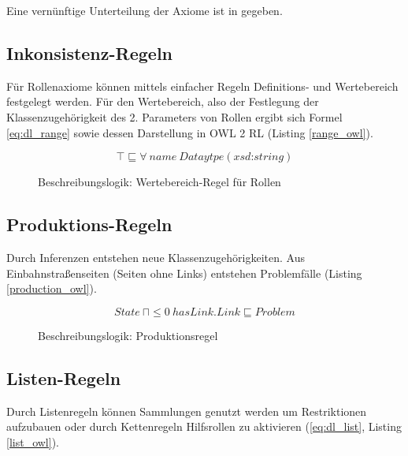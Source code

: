 \documentclass[runningheads,a4paper]{llncs}
\begin{document}
Eine vernünftige Unterteilung der Axiome ist in \cite{owl2rif} gegeben. 


\subsection{Inkonsistenz-Regeln}
\label{sec:rule_inconsistency}

Für Rollenaxiome können mittels einfacher Regeln Definitions- und Wertebereich festgelegt werden. 
Für den Wertebereich, also der Festlegung der Klassenzugehörigkeit des 2. Parameters von Rollen ergibt sich Formel \eqref{eq:dl_range} sowie dessen Darstellung in OWL 2 RL (Listing \ref{range_owl}).

\begin{figure}
\begin{equation}
\top \sqsubseteq \forall\ name\ Dataytpe(\textit{xsd:string})
\label{eq:dl_range}
\end{equation}
\caption{Beschreibungslogik: Wertebereich-Regel für Rollen}
\end{figure}



\subsection{Produktions-Regeln}
\label{sec:rule_production}

Durch Inferenzen entstehen neue Klassenzugehörigkeiten. 
Aus Einbahnstraßenseiten (Seiten ohne Links) entstehen Problemfälle (Listing \ref{production_owl}). 
\begin{figure}
\begin{equation}
State\ \sqcap \leq 0\ hasLink.Link \sqsubseteq Problem
\label{eq:dl_infered}
\end{equation}
\caption{Beschreibungslogik: Produktionsregel}
\end{figure}



\subsection{Listen-Regeln}
\label{sec:rule_list}

Durch Listenregeln können Sammlungen genutzt werden um Restriktionen aufzubauen oder durch Kettenregeln Hilfsrollen zu aktivieren (\eqref{eq:dl_list}, Listing \ref{list_owl}).
\end{document}
